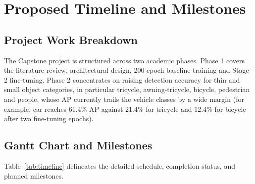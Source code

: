 \documentclass[12pt,a4paper]{report}
\begin{document}
\chapter{Proposed Timeline and Milestones}

\section{Project Work Breakdown}
The Capstone project is structured across two academic phases. Phase 1 covers the literature review, architectural design, 200-epoch baseline training and Stage-2 fine-tuning. Phase 2 concentrates on raising detection accuracy for thin and small object categories, in particular tricycle, awning-tricycle, bicycle, pedestrian and people, whose AP currently trails the vehicle classes by a wide margin (for example, car reaches 61.4\% AP against 21.4\% for tricycle and 12.4\% for bicycle after two fine-tuning epochs).

\section{Gantt Chart and Milestones}
Table~\ref{tab:timeline} delineates the detailed schedule, completion status, and planned milestones.
\end{document}
